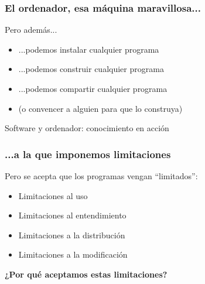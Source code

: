 \documentclass[17pt,aspectratio=169]{beamer}
\begin{document}

\begin{frame}
\frametitle{El ordenador, esa máquina maravillosa...}

Pero además...

\begin{itemize}
\item ...podemos instalar cualquier programa
\item ...podemos construir cualquier programa
\item ...podemos compartir cualquier programa
\item (o convencer a alguien para que lo construya)
\end{itemize}

\vspace{.2cm}

\begin{center}
Software y ordenador: conocimiento en acción
\end{center}
\end{frame}


\begin{frame}
\frametitle{...a la que imponemos limitaciones}

Pero se acepta que los programas vengan ``limitados'':

\vspace{.2cm}

\begin{itemize}
\item Limitaciones al uso
\item Limitaciones al entendimiento
\item Limitaciones a la distribución
\item Limitaciones a la modificación
\end{itemize}

\end{frame}


\begin{frame}

\begin{center}
\textbf{\Huge ¿Por qué aceptamos estas limitaciones?}
\end{center}
\end{frame}

\end{document}

